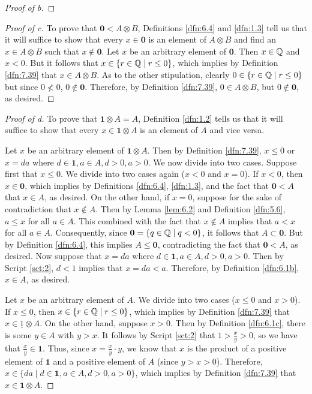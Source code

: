 \documentclass[../main.tex]{subfiles}
\begin{document}
\begin{exercise}
\begin{proof}[Proof of b]
    \end{proof}
    \begin{proof}[Proof of c]
        To prove that $\bm{0}<A\otimes B$, Definitions \ref{dfn:6.4} and \ref{dfn:1.3} tell us that it will suffice to show that every $x\in\bm{0}$ is an element of $A\otimes B$ and find an $x\in A\otimes B$ such that $x\notin\bm{0}$. Let $x$ be an arbitrary element of $\bm{0}$. Then $x\in\mathbb{Q}$ and $x<0$. But it follows that $x\in\{r\in\mathbb{Q}\mid r\leq 0\}$, which implies by Definition \ref{dfn:7.39} that $x\in A\otimes B$. As to the other stipulation, clearly $0\in\{r\in\mathbb{Q}\mid r\leq 0\}$ but since $0\not<0$, $0\notin\bm{0}$. Therefore, by Definition \ref{dfn:7.39}, $0\in A\otimes B$, but $0\notin\bm{0}$, as desired.
    \end{proof}
    \begin{proof}[Proof of d]
        To prove that $\bm{1}\otimes A=A$, Definition \ref{dfn:1.2} tells us that it will suffice to show that every $x\in\bm{1}\otimes A$ is an element of $A$ and vice versa.\par
        Let $x$ be an arbitrary element of $\bm{1}\otimes A$. Then by Definition \ref{dfn:7.39}, $x\leq 0$ or $x=da$ where $d\in\bm{1},a\in A,d>0,a>0$. We now divide into two cases. Suppose first that $x\leq 0$. We divide into two cases again ($x<0$ and $x=0$). If $x<0$, then $x\in\bm{0}$, which implies by Definitions \ref{dfn:6.4}, \ref{dfn:1.3}, and the fact that $\bm{0}<A$ that $x\in A$, as desired. On the other hand, if $x=0$, suppose for the sake of contradiction that $x\notin A$. Then by Lemma \ref{lem:6.2} and Definition \ref{dfn:5.6}, $a\leq x$ for all $a\in A$. This combined with the fact that $x\notin A$ implies that $a<x$ for all $a\in A$. Consequently, since $\bm{0}=\{q\in\mathbb{Q}\mid q<0\}$, it follows that $A\subset\bm{0}$. But by Definition \ref{dfn:6.4}, this implies $A\leq\bm{0}$, contradicting the fact that $\bm{0}<A$, as desired. Now suppose that $x=da$ where $d\in\bm{1},a\in A,d>0,a>0$. Then by Script \ref{sct:2}, $d<1$ implies that $x=da<a$. Therefore, by Definition \ref{dfn:6.1b}, $x\in A$, as desired.\par
        Let $x$ be an arbitrary element of $A$. We divide into two cases ($x\leq 0$ and $x>0$). If $x\leq 0$, then $x\in\{r\in\mathbb{Q}\mid r\leq 0\}$, which implies by Definition \ref{dfn:7.39} that $x\in\underline{1}\otimes A$. On the other hand, suppose $x>0$. Then by Definition \ref{dfn:6.1c}, there is some $y\in A$ with $y>x$. It follows by Script \ref{sct:2} that $1>\frac{x}{y}>0$, so we have that $\frac{x}{y}\in\bm{1}$. Thus, since $x=\frac{x}{y}\cdot y$, we know that $x$ is the product of a positive element of $\bm{1}$ and a positive element of $A$ (since $y>x>0$). Therefore, $x\in\{da\mid d\in\bm{1},a\in A,d>0,a>0\}$, which implies by Definition \ref{dfn:7.39} that $x\in\bm{1}\otimes A$.
    \end{proof}
\end{exercise}
\end{document}
